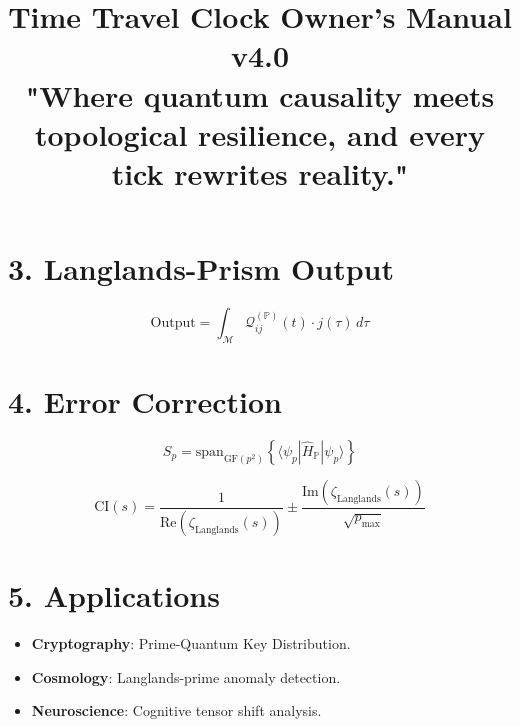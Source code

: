 \documentclass{article}
\theoremstyle{plain}
\begin{document}
\section*{3. Langlands-Prism Output}
\[
\text{Output} = \int_{\mathcal{M}} \mathcal{Q}_{ij}^{(\mathbb{P})}(t) \cdot j(\tau) \, d\tau
\]

\section*{4. Error Correction}
\[
S_p = \text{span}_{\text{GF}(p^2)} \left\{ \langle \psi_p | \hat{H}_{\mathbb{P}} | \psi_p \rangle \right\}
\]

\[
\text{CI}(s) = \frac{1}{\text{Re}(\zeta_{\text{Langlands}}(s))} \pm \frac{\text{Im}(\zeta_{\text{Langlands}}(s))}{\sqrt{p_{\text{max}}}}
\]

\section*{5. Applications}
\begin{itemize}
  \item \textbf{Cryptography}: Prime-Quantum Key Distribution.
  \item \textbf{Cosmology}: Langlands-prime anomaly detection.
  \item \textbf{Neuroscience}: Cognitive tensor shift analysis.
\end{itemize}
\title{\textbf{Time Travel Clock Owner’s Manual v4.0}\\
\large "Where quantum causality meets topological resilience, and every tick rewrites reality."}
\author{}
\date{}
\end{document}
